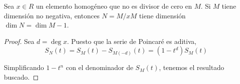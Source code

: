 \begin{corollary}
Sea $x \in R$ un elemento homogéneo que no es divisor de cero en $M$. Si $M$ tiene dimensión no negativa, entonces $N = M/xM$ tiene dimensión $\dim N = \dim M - 1$.
\end{corollary}

\begin{proof}
Sea $d = \deg x$. Puesto que la serie de Poincaré es aditiva,
$$S_N(t) = S_M(t) - S_{M(-d)}(t) = (1 - t^d) S_M(t)$$

Simplificando $1 - t^n$ con el denominador de $S_M(t)$, tenemos el resultado buscado.
\end{proof}
